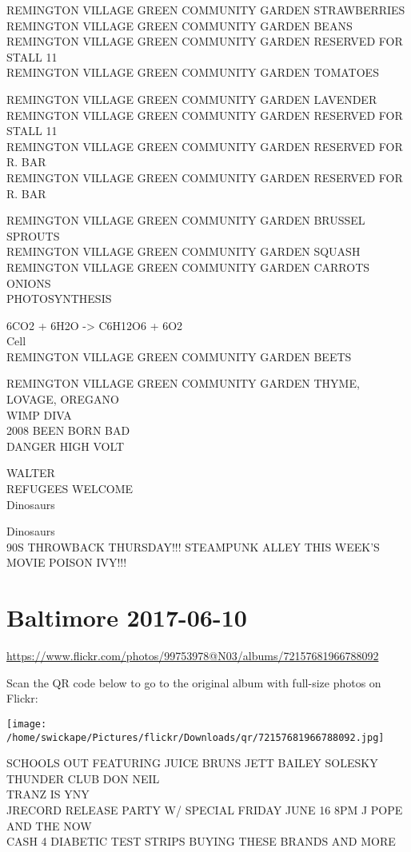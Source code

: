 \documentclass[10pt,letterpaper]{article}
\begin{document}
REMINGTON VILLAGE GREEN COMMUNITY GARDEN STRAWBERRIES\\
REMINGTON VILLAGE GREEN COMMUNITY GARDEN BEANS\\
REMINGTON VILLAGE GREEN COMMUNITY GARDEN RESERVED FOR STALL 11\\
REMINGTON VILLAGE GREEN COMMUNITY GARDEN TOMATOES

REMINGTON VILLAGE GREEN COMMUNITY GARDEN LAVENDER\\
REMINGTON VILLAGE GREEN COMMUNITY GARDEN RESERVED FOR STALL 11\\
REMINGTON VILLAGE GREEN COMMUNITY GARDEN RESERVED FOR R. BAR\\
REMINGTON VILLAGE GREEN COMMUNITY GARDEN RESERVED FOR R. BAR

REMINGTON VILLAGE GREEN COMMUNITY GARDEN BRUSSEL SPROUTS\\
REMINGTON VILLAGE GREEN COMMUNITY GARDEN SQUASH\\
REMINGTON VILLAGE GREEN COMMUNITY GARDEN CARROTS ONIONS\\
PHOTOSYNTHESIS

6CO2 + 6H2O {-}> C6H12O6 + 6O2\\
Cell\\
REMINGTON VILLAGE GREEN COMMUNITY GARDEN BEETS

REMINGTON VILLAGE GREEN COMMUNITY GARDEN THYME, LOVAGE, OREGANO\\
WIMP DIVA\\
2008 BEEN BORN BAD\\
DANGER HIGH VOLT

WALTER\\
REFUGEES WELCOME\\
Dinosaurs

Dinosaurs\\
90S THROWBACK THURSDAY!!! STEAMPUNK ALLEY THIS WEEK'S MOVIE POISON IVY!!!


\section*{Baltimore 2017-06-10}

\url{https://www.flickr.com/photos/99753978@N03/albums/72157681966788092}

Scan the QR code below to go to the original album with full-size photos on Flickr:

\texttt{[image: /home/swickape/Pictures/flickr/Downloads/qr/72157681966788092.jpg]}


SCHOOLS OUT FEATURING JUICE BRUNS JETT BAILEY SOLESKY THUNDER CLUB DON NEIL\\
TRANZ IS YNY\\
JRECORD RELEASE PARTY W/ SPECIAL FRIDAY JUNE 16 8PM J POPE AND THE NOW\\
CASH 4 DIABETIC TEST STRIPS BUYING THESE BRANDS AND MORE
\end{document}
